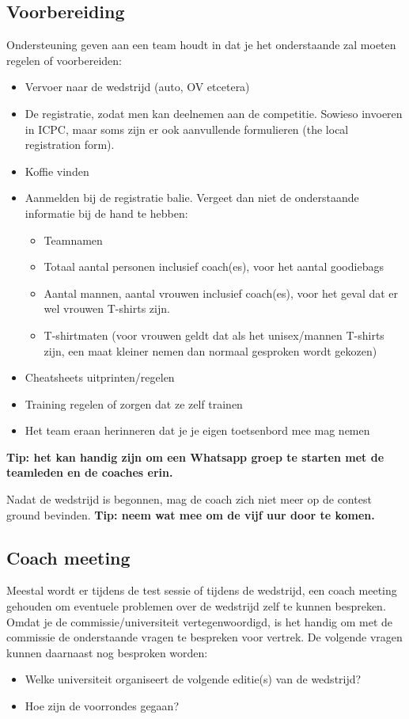 	\subsection{Voorbereiding}
	Ondersteuning geven aan een team houdt in dat je het onderstaande zal moeten regelen of voorbereiden:
	\begin{itemize}
	\item Vervoer naar de wedstrijd (auto, OV etcetera)
	\item De registratie, zodat men kan deelnemen aan de competitie. Sowieso invoeren in ICPC, maar soms zijn er ook aanvullende formulieren (the local registration form).
	\item Koffie vinden
	\item Aanmelden bij de registratie balie. Vergeet dan niet de onderstaande informatie bij de hand te hebben:
		\begin{itemize}
		\item 	Teamnamen
		\item 	Totaal aantal personen inclusief coach(es), voor het aantal goodiebags
		\item 	Aantal mannen, aantal vrouwen inclusief coach(es), voor het geval dat er wel vrouwen T-shirts zijn.
		\item 	T-shirtmaten (voor vrouwen geldt dat als het unisex/mannen T-shirts zijn, een maat kleiner nemen dan normaal gesproken wordt gekozen)
		\end{itemize}
	\item Cheatsheets uitprinten/regelen
	\item Training regelen of zorgen dat ze zelf trainen
	\item Het team eraan herinneren dat je je eigen toetsenbord mee mag nemen
	\end{itemize}
	\textbf{Tip: het kan handig zijn om een Whatsapp groep te starten met de teamleden en de coaches erin.}

	Nadat de wedstrijd is begonnen, mag de coach zich niet meer op de contest ground bevinden. \textbf{Tip: neem wat mee om de vijf uur door te komen.}
	
	\subsection{Coach meeting}\label{CoachMeeting}
	Meestal wordt er tijdens de test sessie of tijdens de wedstrijd, een coach meeting gehouden om eventuele problemen over de wedstrijd zelf te kunnen bespreken. Omdat je de commissie/universiteit vertegenwoordigd, is het handig om met de commissie de onderstaande vragen te bespreken voor vertrek. De volgende vragen kunnen daarnaast nog besproken worden:
	\begin{itemize}
	\item Welke universiteit organiseert de volgende editie(s) van de wedstrijd?
	\item Hoe zijn de voorrondes gegaan?
	\end{itemize}	
